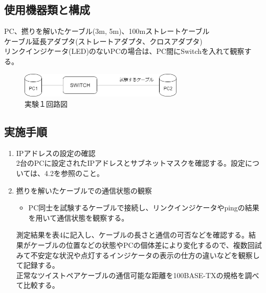 \documentclass[10pt]{article}
\begin{document}
\subsection{使用機器類と構成}
PC、撚りを解いたケーブル(3m, 5m)、100mストレートケーブル\\
ケーブル延長アダプタ(ストレートアダプタ、クロスアダプタ)\\ リンクインジケータ(LED)のないPCの場合は、PC間にSwitchを入れて観察する。
\begin{figure}[H]
		\centering
		\includegraphics[width=0.7\textwidth]{zuni.png}
		\caption{実験１回路図}
	\end{figure}

\subsection{実施手順}

\begin{enumerate}
    \item IPアドレスの設定の確認 \\
    2台のPCに設定されたIPアドレスとサブネットマスクを確認する。設定については、4.2を参照のこと。
    \item 撚りを解いたケーブルでの通信状態の観察
    \begin{itemize}
        \item PC同士を試験するケーブルで接続し、リンクインジケータやpingの結果を用いて通信状態を観察する。
    \end{itemize}
    
    測定結果を表4に記入し、ケーブルの長さと通信の可否などを確認する。結果がケーブルの位置などの状態やPCの個体差により変化するので、複数回試みて不安定な状況や点灯するインジケータの表示の仕方の違いなどを観察して記録する。\\正常なツイストペアケーブルの通信可能な距離を100BASE-TXの規格を調べて比較する。
    
\end{enumerate}
\end{document}

